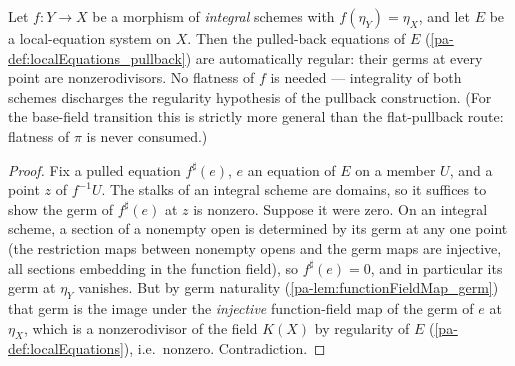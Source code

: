 \begin{lemma}
  \label{pa-lem:pullbackEqn_regular}
  \leanok

  Let \(f : Y \to X\) be a morphism of \emph{integral} schemes with
  \(f(\eta_Y) = \eta_X\), and let \(E\) be a local-equation system on \(X\). Then the
  pulled-back equations of \(E\) (\ref{pa-def:localEquations_pullback}) are automatically
  regular: their germs at every point are nonzerodivisors. No flatness of \(f\) is
  needed --- integrality of both schemes discharges the regularity hypothesis of the
  pullback construction. (For the base-field transition this is strictly more general
  than the flat-pullback route: flatness of \(\pi\) is never consumed.)
\end{lemma}
\begin{proof}
  \leanok
  Fix a pulled equation \(f^{\sharp}(e)\), \(e\) an equation of \(E\) on a member
  \(U\), and a point \(z\) of \(f^{-1}U\). The stalks of an integral scheme are
  domains, so it suffices to show the germ of \(f^{\sharp}(e)\) at \(z\) is nonzero.
  Suppose it were zero. On an integral scheme, a section of a nonempty open is
  determined by its germ at any one point (the restriction maps between nonempty opens
  and the germ maps are injective, all sections embedding in the function field), so
  \(f^{\sharp}(e) = 0\), and in particular its germ at \(\eta_Y\) vanishes. But by
  germ naturality (\ref{pa-lem:functionFieldMap_germ}) that germ is the image under the
  \emph{injective} function-field map of the germ of \(e\) at \(\eta_X\), which is a
  nonzerodivisor of the field \(K(X)\) by regularity of \(E\)
  (\ref{pa-def:localEquations}), i.e.\ nonzero. Contradiction.
\end{proof}

